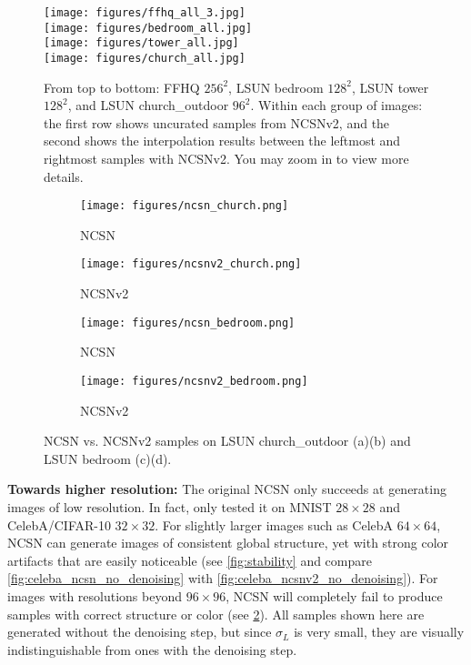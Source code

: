 \documentclass{article}
\begin{document}
\begin{figure}
    \centering
    \texttt{[image: figures/ffhq\_all\_3.jpg]}\\
    \texttt{[image: figures/bedroom\_all.jpg]}\\
    \texttt{[image: figures/tower\_all.jpg]}\\
    \texttt{[image: figures/church\_all.jpg]}
    \caption{From top to bottom: FFHQ $256^2$, LSUN bedroom $128^2$, LSUN tower $128^2$, and LSUN church\_outdoor $96^2$. Within each group of images: the first row shows uncurated samples from NCSNv2, and the second shows the interpolation results between the leftmost and rightmost samples with NCSNv2. You may zoom in to view more details.}
    \label{fig:large_samples}
\end{figure}
\begin{figure}
    \centering
    \begin{subfigure}[b]{0.23\textwidth}
        \texttt{[image: figures/ncsn\_church.png]}
        \caption{NCSN}
    \end{subfigure}
    \begin{subfigure}[b]{0.23\textwidth}
        \texttt{[image: figures/ncsnv2\_church.png]}
        \caption{NCSNv2}
    \end{subfigure}
    \begin{subfigure}[b]{0.23\textwidth}
        \texttt{[image: figures/ncsn\_bedroom.png]}
        \caption{NCSN}
    \end{subfigure}
    \begin{subfigure}[b]{0.23\textwidth}
        \texttt{[image: figures/ncsnv2\_bedroom.png]}
        \caption{NCSNv2}
    \end{subfigure}
    \caption{NCSN vs. NCSNv2 samples on LSUN church\_outdoor (a)(b) and LSUN bedroom (c)(d).}
    \label{fig:sample_compare}
\end{figure}
\textbf{Towards higher resolution:} The original NCSN only succeeds at generating images of low resolution. In fact, \cite{song2019generative} only tested it on MNIST $28\times 28$ and CelebA/CIFAR-10 $32\times 32$. For slightly larger images such as CelebA $64\times 64$, NCSN can generate images of consistent global structure, yet with strong color artifacts that are easily noticeable (see \cref{fig:stability} and compare \cref{fig:celeba_ncsn_no_denoising} with \cref{fig:celeba_ncsnv2_no_denoising}). For images with resolutions beyond $96\times 96$, NCSN will completely fail to produce samples with correct structure or color (see \cref{fig:sample_compare}). All samples shown here are generated without the denoising step, but since $\sigma_L$ is very small, they are visually indistinguishable from ones with the denoising step.
\end{document}
